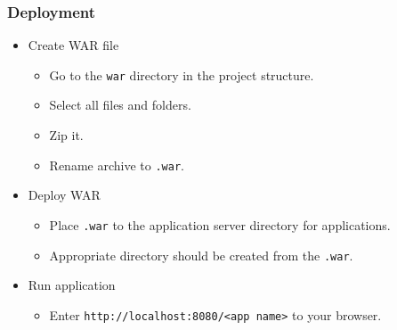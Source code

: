 \documentclass[10pt,table, xcolor=pdflatex]{beamer}
\begin{document}
\begin{frame}[fragile]\frametitle{Deployment}
	\begin{itemize}
		\item Create WAR file
          \begin{itemize}
        	\item Go to the \texttt{war} directory in the project structure.
            \item Select all files and folders.
            \item Zip it.
            \item Rename archive to \texttt{.war}.
          \end{itemize}
        \item Deploy WAR
          \begin{itemize}
        	\item Place \texttt{.war} to the application server directory for applications.
            \item Appropriate directory should be created from the \texttt{.war}.
          \end{itemize}
        \item Run application
          \begin{itemize}
        	\item Enter \verb'http://localhost:8080/<app name>' to your browser.
          \end{itemize}
	\end{itemize}
\end{frame}
\end{document}

